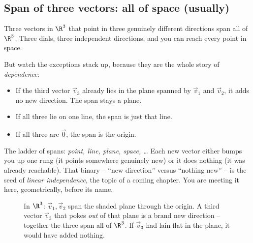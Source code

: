 \subsection{Span of three vectors: all of space (usually)}

Three vectors in $\R^3$ that point in three genuinely different directions span all of $\R^3$. Three dials, three independent directions, and you can reach every point in space.

But watch the exceptions stack up, because they are the whole story of \emph{dependence}:

\begin{itemize}
  \item If the third vector $\vec{v}_3$ already lies in the plane spanned by $\vec{v}_1$ and $\vec{v}_2$, it adds no new direction. The span stays a plane.
  \item If all three lie on one line, the span is just that line.
  \item If all three are $\vec{0}$, the span is the origin.
\end{itemize}

\begin{focusbox}
The ladder of spans: \emph{point, line, plane, space, \dots} Each new vector either bumps you up one rung (it points somewhere genuinely new) or it does nothing (it was already reachable). That binary -- ``new direction'' versus ``nothing new'' -- is the seed of \emph{linear independence}, the topic of a coming chapter. You are meeting it here, geometrically, before its name.
\end{focusbox}

\begin{figure}[H]
\centering
{}
\caption{In $\R^3$: $\vec{v}_1,\vec{v}_2$ span the shaded plane through the origin. A third vector $\vec{v}_3$ that pokes \emph{out} of that plane is a brand new direction -- together the three span all of $\R^3$. If $\vec{v}_3$ had lain flat in the plane, it would have added nothing.}
\label{ch03:three-3d}
\end{figure}

